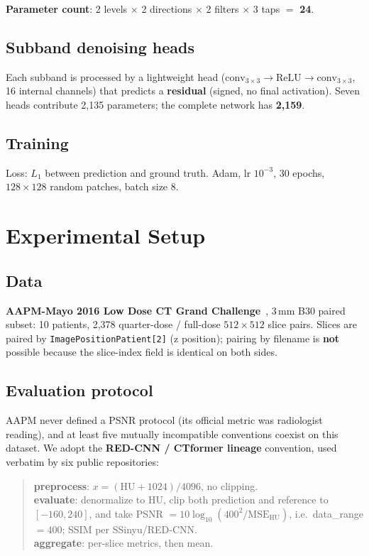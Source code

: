 \documentclass[conference]{IEEEtran}
\begin{document}
\textbf{Parameter count}: 2 levels $\times$ 2 directions $\times$ 2 filters
$\times$ 3 taps $=$ \textbf{24}.

\subsection{Subband denoising heads}
Each subband is processed by a lightweight head ($\text{conv}_{3\times3}
\rightarrow \text{ReLU} \rightarrow \text{conv}_{3\times3}$, 16 internal
channels) that predicts a \textbf{residual} (signed, no final activation). Seven
heads contribute 2,135 parameters; the complete network has \textbf{2,159}.

\subsection{Training}
Loss: $L_1$ between prediction and ground truth. Adam, lr $10^{-3}$, 30 epochs,
$128\times128$ random patches, batch size 8.

\section{Experimental Setup}

\subsection{Data}
\textbf{AAPM-Mayo 2016 Low Dose CT Grand Challenge}~\cite{mccollough2020tcia,%
moen2021ldctdata}, 3\,mm B30 paired subset: 10 patients, 2,378 quarter-dose /
full-dose $512\times512$ slice pairs. Slices are paired by
\texttt{ImagePositionPatient[2]} (z position); pairing by filename is
\textbf{not} possible because the slice-index field is identical on both sides.

\subsection{Evaluation protocol}
\label{sec:eval}
AAPM never defined a PSNR protocol (its official metric was radiologist
reading), and at least five mutually incompatible conventions coexist on this
dataset. We adopt the \textbf{RED-CNN / CTformer lineage} convention, used
verbatim by six public repositories:
\begin{quote}
\small
\textbf{preprocess}: $x = (\mathrm{HU} + 1024)/4096$, no clipping.\\
\textbf{evaluate}: denormalize to HU, clip both prediction and reference to
$[-160, 240]$, and take PSNR $= 10\log_{10}(400^2/\mathrm{MSE}_{\mathrm{HU}})$,
i.e.\ data\_range $=400$; SSIM per SSinyu/RED-CNN.\\
\textbf{aggregate}: per-slice metrics, then mean.
\end{quote}
\end{document}
